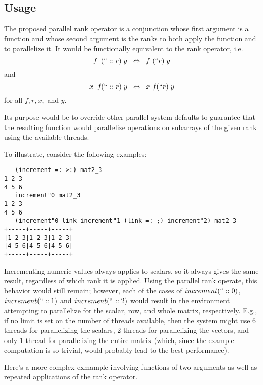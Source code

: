 \subsection{Usage}
The proposed parallel rank operator is a conjunction 
whose first argument is a function 
and whose second argument is the ranks to both apply the function and to parallelize it. 
It would be functionally equivalent to the rank operator, i.e. 
\[f\;\;(``::r)\;y\;\;\Leftrightarrow\;\;f\;(``r)\;y\] and \[x\;\;f(``::r)\;y\;\;\Leftrightarrow\;\;x\;f(``r)\;y\] for all $f, r, x,$ and $y$.

Its purpose would be to override other parallel system defaults 
to guarantee that the resulting function would parallelize operations on subarrays of the given rank 
using the available threads.

To illustrate, consider the following examples:

\begin{singlespacing}
\begin{small}
\begin{verbatim}
   (increment =: >:) mat2_3
1 2 3
4 5 6
   increment"0 mat2_3
1 2 3
4 5 6
   (increment"0 link increment"1 (link =: ;) increment"2) mat2_3
+-----+-----+-----+
|1 2 3|1 2 3|1 2 3|
|4 5 6|4 5 6|4 5 6|
+-----+-----+-----+
\end{verbatim}
\end{small}
\end{singlespacing}

Incrementing numeric values always applies to scalars, so it always gives the same result, 
regardless of which rank it is applied. 
Using the parallel rank operate, this behavior would still remain; 
however, each of the cases of $increment(``::0)$, $increment(``::1)$ and $increment(``::2)$ 
would result in the environment attempting to parallelize for the scalar, row, and whole matrix, respectively.
E.g., if no limit is set on the number of threads available, 
then the system might use 6 threads for parallelizing the scalars, 
2 threads for parallelizing the vectors, 
and only 1 thread for parallelizing the entire matrix 
(which, since the example computation is so trivial, would probably lead to the best performance).

Here's a more complex exmample involving functions of two arguments 
as well as repeated applications of the rank operator.

